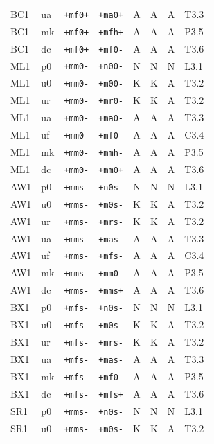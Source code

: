 {\begin{longtable}{@{}llllcccl@{}}
BC1 & ua & \texttt{+mf0+} & \texttt{+ma0+} & A & A & A & T3.3 \\
BC1 & mk & \texttt{+mf0+} & \texttt{+mfh+} & A & A & A & P3.5 \\
BC1 & dc & \texttt{+mf0+} & \texttt{+mf0-} & A & A & A & T3.6 \\
ML1 & p0 & \texttt{+mm0-} & \texttt{+n00-} & N & N & N & L3.1 \\
ML1 & u0 & \texttt{+mm0-} & \texttt{+m00-} & K & K & A & T3.2 \\
ML1 & ur & \texttt{+mm0-} & \texttt{+mr0-} & K & K & A & T3.2 \\
ML1 & ua & \texttt{+mm0-} & \texttt{+ma0-} & A & A & A & T3.3 \\
ML1 & uf & \texttt{+mm0-} & \texttt{+mf0-} & A & A & A & C3.4 \\
ML1 & mk & \texttt{+mm0-} & \texttt{+mmh-} & A & A & A & P3.5 \\
ML1 & dc & \texttt{+mm0-} & \texttt{+mm0+} & A & A & A & T3.6 \\
AW1 & p0 & \texttt{+mms-} & \texttt{+n0s-} & N & N & N & L3.1 \\
AW1 & u0 & \texttt{+mms-} & \texttt{+m0s-} & K & K & A & T3.2 \\
AW1 & ur & \texttt{+mms-} & \texttt{+mrs-} & K & K & A & T3.2 \\
AW1 & ua & \texttt{+mms-} & \texttt{+mas-} & A & A & A & T3.3 \\
AW1 & uf & \texttt{+mms-} & \texttt{+mfs-} & A & A & A & C3.4 \\
AW1 & mk & \texttt{+mms-} & \texttt{+mm0-} & A & A & A & P3.5 \\
AW1 & dc & \texttt{+mms-} & \texttt{+mms+} & A & A & A & T3.6 \\
BX1 & p0 & \texttt{+mfs-} & \texttt{+n0s-} & N & N & N & L3.1 \\
BX1 & u0 & \texttt{+mfs-} & \texttt{+m0s-} & K & K & A & T3.2 \\
BX1 & ur & \texttt{+mfs-} & \texttt{+mrs-} & K & K & A & T3.2 \\
BX1 & ua & \texttt{+mfs-} & \texttt{+mas-} & A & A & A & T3.3 \\
BX1 & mk & \texttt{+mfs-} & \texttt{+mf0-} & A & A & A & P3.5 \\
BX1 & dc & \texttt{+mfs-} & \texttt{+mfs+} & A & A & A & T3.6 \\
SR1 & p0 & \texttt{+mms-} & \texttt{+n0s-} & N & N & N & L3.1 \\
SR1 & u0 & \texttt{+mms-} & \texttt{+m0s-} & K & K & A & T3.2 \\

\end{longtable}}
